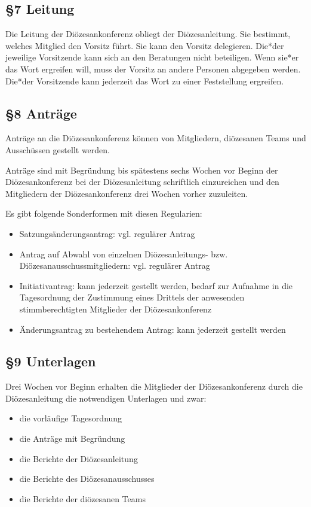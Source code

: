 \documentclass[12pt]{report}
\begin{document}
\begin{flushleft}
\subsection*{§7 Leitung}
Die Leitung der Diözesankonferenz obliegt der Diözesanleitung. Sie bestimmt, welches Mitglied den Vorsitz
führt. Sie kann den Vorsitz delegieren. Die*der jeweilige Vorsitzende kann sich an den Beratungen nicht beteiligen.
Wenn sie*er das Wort ergreifen will, muss der Vorsitz an andere Personen abgegeben werden.
Die*der Vorsitzende kann jederzeit das Wort zu einer Feststellung ergreifen.
\subsection*{§8 Anträge}
Anträge an die Diözesankonferenz können von Mitgliedern, diözesanen Teams und Ausschüssen gestellt werden.

Anträge sind mit Begründung bis spätestens sechs Wochen vor Beginn der Diözesankonferenz bei der Diözesanleitung
schriftlich einzureichen und den Mitgliedern der Diözesankonferenz drei Wochen vorher zuzuleiten.

Es gibt folgende Sonderformen mit diesen Regularien:
\begin{itemize}
  \item Satzungsänderungsantrag: vgl. regulärer Antrag
  \item Antrag auf Abwahl von einzelnen Diözesanleitungs- bzw. Diözesanausschussmitgliedern:
        vgl. regulärer Antrag
  \item Initiativantrag: kann jederzeit gestellt werden, bedarf zur Aufnahme in die Tagesordnung der Zustimmung
        eines Drittels der anwesenden stimmberechtigten Mitglieder der Diözesankonferenz
  \item Änderungsantrag zu bestehendem Antrag: kann jederzeit gestellt werden
\end{itemize}

\subsection*{§9 Unterlagen}
Drei Wochen vor Beginn erhalten die Mitglieder der Diözesankonferenz durch die Diözesanleitung die notwendigen
Unterlagen und zwar:
\begin{itemize}
  \item die vorläufige Tagesordnung
  \item die Anträge mit Begründung
  \item die Berichte der Diözesanleitung	
  \item die Berichte des Diözesanausschusses	
  \item die Berichte der diözesanen Teams
\end{itemize}


\end{flushleft}
\end{document}
